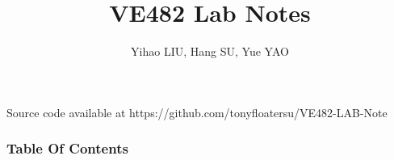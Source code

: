 \documentclass[slidestop,compress,mathserif]{beamer}
\title{VE482 Lab Notes}
\author{Yihao LIU, Hang SU, Yue YAO}
\institute{VE482 AU18 TA Group}
\begin{document}
\begin{frame} %
	\titlepage
	\tiny{Source code available at https://github.com/tonyfloatersu/VE482-LAB-Note}
\end{frame}

\begin{frame}[allowframebreaks]
    \small
    \frametitle{Table Of Contents}
    \tableofcontents
\end{frame}

\end{document}
